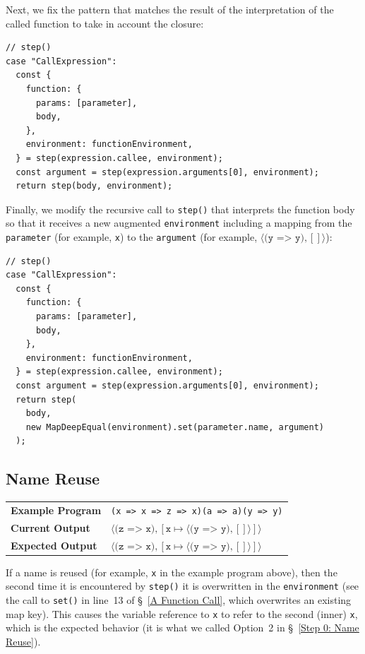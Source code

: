 \documentclass[12pt, oneside]{book}
\begin{document}
Next, we fix the pattern that matches the result of the interpretation of the called function to take in account the closure:

\begin{verbatim}
// step()
case "CallExpression":
  const {
    function: {
      params: [parameter],
      body,
    },
    environment: functionEnvironment,
  } = step(expression.callee, environment);
  const argument = step(expression.arguments[0], environment);
  return step(body, environment);
\end{verbatim}

Finally, we modify the recursive call to \texttt{step()} that interprets the function body so that it receives a new augmented \texttt{environment} including a mapping from the \texttt{parameter} (for example, \texttt{x}) to the \texttt{argument} (for example, $\langle \texttt{(y => y)}, [] \rangle$):

\begin{verbatim}
// step()
case "CallExpression":
  const {
    function: {
      params: [parameter],
      body,
    },
    environment: functionEnvironment,
  } = step(expression.callee, environment);
  const argument = step(expression.arguments[0], environment);
  return step(
    body,
    new MapDeepEqual(environment).set(parameter.name, argument)
  );
\end{verbatim}

\subsection{Name Reuse}

\begin{center}
\begin{tabular}{ll}
\textbf{Example Program} & \texttt{(x => x => z => x)(a => a)(y => y)} \\
\textbf{Current Output} & $\langle \texttt{(z => x)}, [\texttt{x} \mapsto \langle \texttt{(y => y)}, [] \rangle] \rangle$ \\
\textbf{Expected Output} & $\langle \texttt{(z => x)}, [\texttt{x} \mapsto \langle \texttt{(y => y)}, [] \rangle] \rangle$ \\
\end{tabular}
\end{center}

If a name is reused (for example, \texttt{x} in the example program above), then the second time it is encountered by \texttt{step()} it is overwritten in the \texttt{environment} (see the call to \texttt{set()} in line~13 of §~\ref{A Function Call}, which overwrites an existing map key). This causes the variable reference to \texttt{x} to refer to the second (inner) \texttt{x}, which is the expected behavior (it is what we called Option~2 in §~\ref{Step 0: Name Reuse}).
\end{document}
